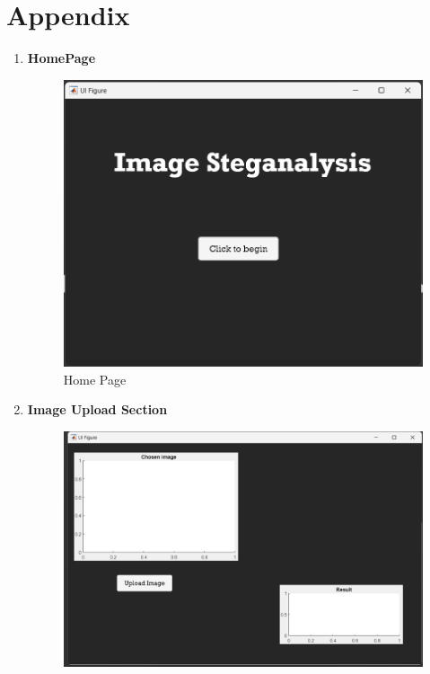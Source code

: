 \chapter*{Appendix}
\renewcommand{\thefigure}{A-\arabic{figure}}
\begin{enumerate}
\item \Large \textbf{HomePage} 
\begin{figure}[H]
    \centering
    \includegraphics[width=140mm]{./img/HomePage.png}
    \caption{Home Page}
\end{figure}
\clearpage
\item \Large \textbf{Image Upload Section} 
\begin{figure}[H]
    \centering
    \includegraphics[width=140mm]{./img/choose.png}

\end{figure}
\end{enumerate}
